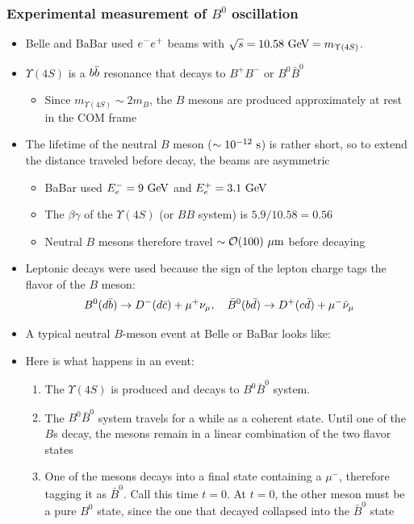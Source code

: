 \subsubsection{Experimental measurement of $B^0$ oscillation}
\begin{itemize}
  \item Belle and BaBar used $e^{-}e^{+}$ beams with $\sqrt s = 10.58~\text{GeV} = m_{\Upsilon(4S)}$.
  \item $\Upsilon(4S)$ is a $b\bar{b}$ resonance that decays to $B^+ B^-$ or $B^0 \bar B^0$
  \begin{itemize}
    \item Since $m_{\Upsilon(4S)} \sim 2 m_B$, the $B$ mesons are produced approximately at rest in the COM frame
  \end{itemize}
  \item The lifetime of the neutral $B$ meson ($\sim 10^{-12}~\text{s}$) is rather short, so to extend the distance traveled before decay, the beams are asymmetric
  \begin{itemize}
    \item BaBar used $E_e^{-} = 9~\text{GeV}$ and $E_e^{+} = 3.1~\text{GeV}$
    \item The $\beta\gamma$ of the $\Upsilon(4S)$  (or $BB$ system) is $5.9/10.58 = 0.56$
    \item Neutral $B$ mesons therefore travel $\sim \mathcal{O}(100)~\mu\text{m}$ before decaying
  \end{itemize}
  \item Leptonic decays were used because the sign of the lepton charge tags the flavor of the $B$ meson:
  \begin{equation}
    B^0(d\bar{b})\rightarrow D^- (d\bar{c})+\mu^+\nu_\mu,\quad \bar B^0 (b\bar{d}) \rightarrow D^+(c\bar{d}) + \mu^-{\bar{\nu}}_\mu
  \end{equation}
  \item A typical neutral $B$-meson event at Belle or BaBar looks like:
  \item Here is what happens in an event:
  \begin{enumerate}
    \item The $\Upsilon(4S)$ is produced and decays to $B^0 \bar B^0$ system. 
    \item The $B^0 \bar B^0$ system travels for a while as a coherent state. Until one of the $B$s decay, the mesons remain in a linear combination of the two flavor states
    \item One of the mesons decays into a final state containing a $\mu^-$, therefore tagging it as $\bar B^0$. Call this time $t=0$. At $t=0$, the other meson must be a pure $B^0$ state, since the one that decayed collapsed into the $\bar B^0$ state

\end{enumerate}
\end{itemize}
